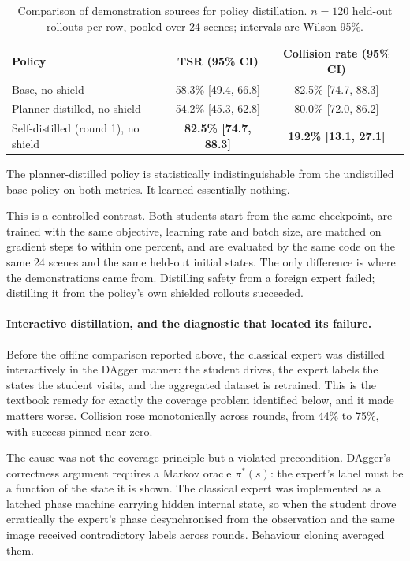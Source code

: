 \documentclass[a4paper,11pt]{report}
\begin{document}
\begin{table}[htbp]
\centering
\caption{Comparison of demonstration sources for policy distillation. $n = 120$ held-out rollouts
  per row, pooled over 24 scenes; intervals are Wilson 95\%.}
\label{tab:demo_source_comparison}
\begin{tabular}{lcc}
\toprule
\textbf{Policy} & \textbf{TSR (95\% CI)} & \textbf{Collision rate (95\% CI)} \\
\midrule
Base, no shield                     & 58.3\% [49.4, 66.8] & 82.5\% [74.7, 88.3] \\
Planner-distilled, no shield        & 54.2\% [45.3, 62.8] & 80.0\% [72.0, 86.2] \\
Self-distilled (round 1), no shield & \textbf{82.5\% [74.7, 88.3]} & \textbf{19.2\% [13.1, 27.1]} \\
\bottomrule
\end{tabular}
\end{table}

The planner-distilled policy is statistically indistinguishable from the undistilled base policy on
both metrics. It learned essentially nothing.

This is a controlled contrast. Both students start from the same checkpoint, are trained with the
same objective, learning rate and batch size, are matched on gradient steps to within one percent,
and are evaluated by the same code on the same 24 scenes and the same held-out initial states. The
only difference is where the demonstrations came from. Distilling safety from a foreign expert
failed; distilling it from the policy's own shielded rollouts succeeded.

\paragraph{Interactive distillation, and the diagnostic that located its failure.}
Before the offline comparison reported above, the classical expert was distilled interactively in
the DAgger manner: the student drives, the expert labels the states the student visits, and the
aggregated dataset is retrained. This is the textbook remedy for exactly the coverage problem
identified below, and it made matters worse. Collision rose monotonically across rounds, from 44\%
to 75\%, with success pinned near zero.

The cause was not the coverage principle but a violated precondition. DAgger's correctness argument
requires a Markov oracle $\pi^{*}(s)$: the expert's label must be a function of the state it is
shown. The classical expert was implemented as a latched phase machine carrying hidden internal
state, so when the student drove erratically the expert's phase desynchronised from the observation
and the same image received contradictory labels across rounds. Behaviour cloning averaged them.
\end{document}
